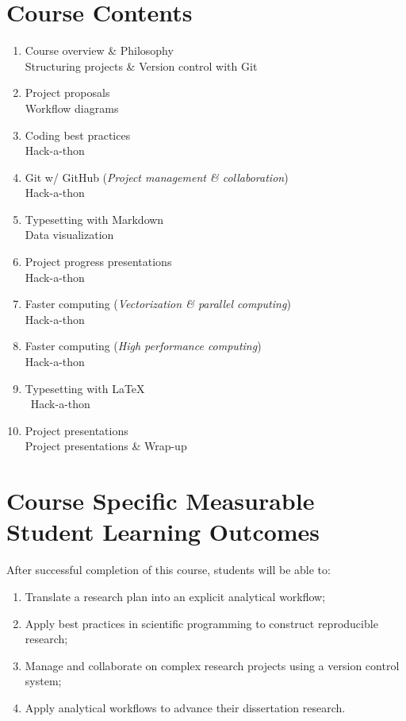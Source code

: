 \documentclass[10pt]{article}
\begin{document}
\section*{Course Contents}
\begin{enumerate}[label=\bfseries Week \arabic*:,leftmargin=*,labelindent=3em]
	\itemsep0em
	\item Course overview \& Philosophy\\
	Structuring projects \& Version control with Git
	\item Project proposals\\
	Workflow diagrams
	\item Coding best practices \\
	Hack-a-thon
	\item Git w/ GitHub (\emph{Project management \& collaboration})\\
	Hack-a-thon
	\item Typesetting with Markdown\\
	Data visualization
	\item Project progress presentations\\
	Hack-a-thon
	\item Faster computing (\emph{Vectorization \& parallel computing})\\
	Hack-a-thon
	\item Faster computing (\emph{High performance computing})\\
	Hack-a-thon
	\item Typesetting with \LaTeX\\\
	Hack-a-thon
	\item Project presentations\\
	Project presentations \& Wrap-up
\end{enumerate}

\section*{Course Specific Measurable Student Learning Outcomes}
After successful completion of this course, students will be able to:
\begin{enumerate}[leftmargin=2cm]
	\itemsep0em
	\item Translate a research plan into an explicit analytical workflow;
	\item Apply best practices in scientific programming to construct reproducible research;
	\item Manage and collaborate on complex research projects using a version control system;
	\item Apply analytical workflows to advance their dissertation research.
\end{enumerate}
\end{document}
